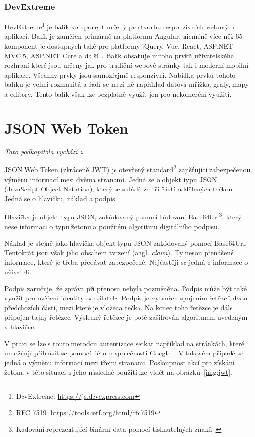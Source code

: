 \subsubsection{DevExtreme}
DevExtreme\footnote{DevExtreme: \url{https://js.devexpress.com}} je balík komponent určený pro tvorbu responzivních webových aplikací. Balík je zaměřen primárně na platformu Angular, nicméně více něž 65 komponent je dostupných také pro platformy jQuery, Vue, React, ASP.NET MVC 5, ASP.NET Core a další~\cite{bib:devextreme}. Balík obsahuje mnoho prvků uživatelského rozhraní které jsou určeny jak pro tradiční webové stránky tak i moderní mobilní aplikace. Všechny prvky jsou samozřejmě responzivní. Nabídka prvků tohoto balíku je velmi rozmanitá a řadí se mezi ně například datová mřížka, grafy, mapy a editory. Tento balík však lze bezplatně využít jen pro nekomerční využití.

\section{JSON Web Token}
\emph{Tato podkapitola vychází z~\cite{bib:jwt}}

JSON Web Token (zkráceně JWT) je otevřený standard\footnote{RFC 7519: \url{https://tools.ietf.org/html/rfc7519}} zajišťující zabezpečenou výměnu informací mezi dvěma stranami. Jedná se o objekt typu JSON (JavaScript Object Notation), který se skládá ze tří částí oddělených tečkou. Jedná se o hlavičku, náklad a podpis.

Hlavička je objekt typu JSON, zakódovaný pomocí kódovaní Base64Url\footnote{Kódování reprezentující binární data pomocí tisknutelných znaků~\cite{bib:base64}}, který nese informaci o typu žetonu a použitém algoritmu digitálního podpisu. 

Náklad je stejně jako hlavička objekt typu JSON zakódovaný pomocí Base64Url. Tentokrát jsou však jeho obsahem tvrzení (angl. \emph{claim}). Ty nesou přenášené informace, které je třeba předávat zabezpečené. Nejčastěji se jedná o informace o uživateli.

Podpis zaručuje, že zpráva při přenosu nebyla pozměněna. Podpis může být také využit pro ověření identity odesílatele. Podpis je vytvořen spojením řetězců dvou předchozích částí, mezi které je vložena tečka. Na konec toho řetězce je dále připojen tajný řetězec. Výsledný řetězec je poté zašifrován algoritmem uvedeným v hlavičce. 

V praxi se lze s touto metodou autentizace setkat například na stránkách, které umožňují přihlásit se pomocí účtu u společnosti Google~\cite{bib:google-jwt}. V takovém případě se jedná o výměnu informací mezi třemi stranami. Posloupnost akcí pro získání žetonu v této situaci a jeho následné použití lze vidět na obrázku~\ref{img:jwt}.

